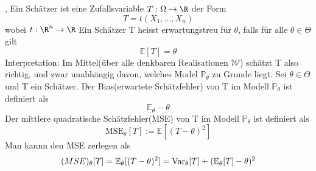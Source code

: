\sep
\Def[1.1] \newline
Ein Schätzer ist eine Zufallsvariable \(T : \Omega \rightarrow \R \) der Form \[ T = t(X_1, \dots , X_n)\] wobei \(t : \R^n \rightarrow \R\)
\Def[1.2] \newline
Ein Schätzer T heisst erwartungstreu für \( \theta \), falls für alle \( \theta \in \Theta\) gilt \[ \mathbb{E}[T] = \theta\]
\Bem[1.2A] \newline
Interpretation: Im Mittel(über alle denkbaren Realisationen \(\mathcal{W}\)) schätzt T also richtig, und zwar unabhängig davon, welches Model \(\mathbb{P}_\theta \) zu Grunde liegt.
\Def[1.3] Sei \(\theta \in \Theta \) und T ein Schätzer. Der Bias(erwartete Schätzfehler) von T im Modell \( \mathbb{P}_\theta\) ist definiert als \[ \mathbb{E}_\theta - \theta\]
Der mittlere quadratische Schätzfehler(MSE) von T im Modell \( \mathbb{P}_\theta\) ist definiert als \[\text{MSE}_\theta[T] := \mathbb{E}[(T - \theta)^2]\]
\Bem[1.3A] \newline
Man kannn den MSE zerlegen als \[ \text(MSE)_\theta[T] = \mathbb{E}_\theta[(T - \theta)^2] = \text{Var}_\theta[T] + (\mathbb{E}_\theta[T] - \theta)^2\]
